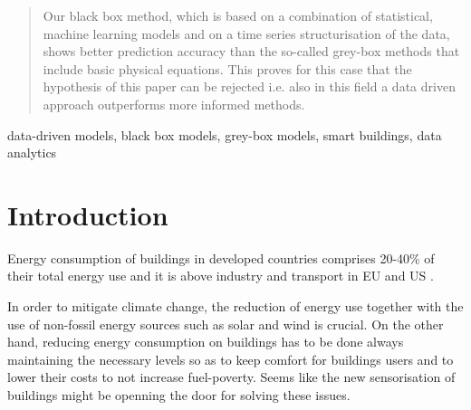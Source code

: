 \documentclass[10pt, conference, compsocconf]{IEEEtran}
\begin{document}
\begin{abstract}

Our black box method, which is based on a combination of statistical, machine learning models and on a time series structurisation of the data, shows better prediction accuracy than the so-called grey-box methods that include basic physical equations. This proves for this case that the hypothesis of this paper can be rejected i.e. also in this field a data driven approach outperforms more informed methods.

\end{abstract}

\begin{IEEEkeywords}
data-driven models, black box models, grey-box models, smart buildings, data analytics

\end{IEEEkeywords}


%
\IEEEpeerreviewmaketitle



\section{Introduction} \label{intro}

Energy consumption of buildings in developed countries comprises 20-40\% of their total energy use and it is above industry and transport in EU and US \cite{perez2008review, energyUS}. 

In order to mitigate climate change, the reduction of energy use together with the use of non-fossil energy sources such as solar and wind is crucial. On the other hand, reducing energy consumption on buildings has to be done always maintaining the necessary levels so as to keep comfort for buildings users and to lower their costs to not increase fuel-poverty. Seems like the new sensorisation of buildings might be openning the door for solving these issues.
\end{document}
